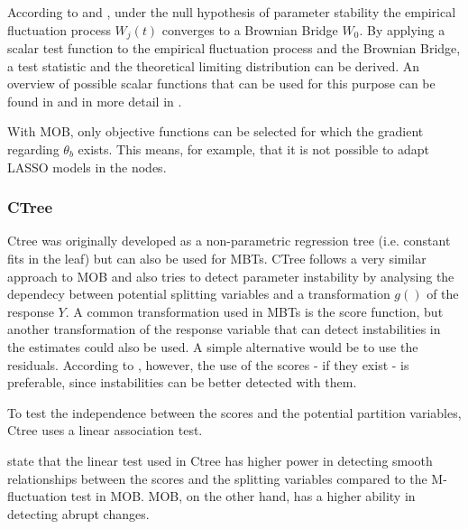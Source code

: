 According to \citep{Zeileis.2008} and \citep{Zeileis.2007}, under the null hypothesis of parameter stability the empirical fluctuation process $W_j(t)$ converges to a Brownian Bridge $W_0$. By applying a scalar test function to the empirical fluctuation process and the Brownian Bridge, a test statistic and the theoretical limiting distribution can be derived. An overview of possible scalar functions that can be used for this purpose can be found in \citep{Zeileis.2008} and in more detail in \citep{Zeileis.2007}.

With MOB, only objective functions can be selected for which the gradient regarding $\theta_b$  exists. This means, for example, that it is not possible to adapt LASSO models in the nodes.



\subsubsection{CTree}
Ctree was originally developed as a non-parametric regression tree (i.e. constant fits in the leaf) but can also be used for MBTs.
CTree follows a very similar approach to MOB and also tries to detect parameter instability by analysing the dependecy between potential splitting variables and a transformation $g()$ of the response $Y$.
A common transformation used in MBTs is the score function, but another transformation of the response variable that can detect instabilities in the estimates could also be used. A simple alternative would be to use the residuals. According to \citep{Schlosser.2019}, however, the use of the scores - if they exist - is preferable, since instabilities can be better detected with them.

To test the independence between the scores and the potential partition variables, Ctree uses a linear association test.


\citep{Schlosser.2019} state that the linear test used in Ctree has higher power in detecting smooth relationships between the scores and the splitting variables compared to the M-fluctuation test in MOB. MOB, on the other hand, has a higher ability in detecting abrupt changes.


